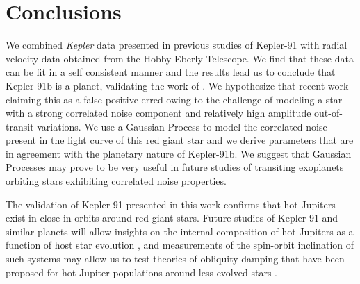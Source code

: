 \documentclass[apjl]{emulateapj}
\begin{document}





\section{Conclusions}
We combined \emph{Kepler} data presented in previous studies of Kepler-91 with radial velocity data obtained from the Hobby-Eberly Telescope. We find that these data can be fit in a self consistent manner and the results lead us to conclude that Kepler-91b is a planet, validating the work of \citet{lillo14}. We hypothesize that recent work claiming this as a false positive erred owing to the challenge of modeling a star with a strong correlated noise component and relatively high amplitude out-of-transit variations. We use a Gaussian Process to model the correlated noise present in the light curve of this red giant star and we derive parameters that are in agreement with the planetary nature of Kepler-91b. We suggest that Gaussian Processes may prove to be very useful in future studies of transiting exoplanets orbiting stars exhibiting correlated noise properties.

The validation of Kepler-91 presented in this work confirms that hot Jupiters exist in close-in orbits around red giant stars. Future studies of Kepler-91 and similar planets will allow insights on the internal composition of hot Jupiters as a function of host star evolution \citep{spiegel12}, and measurements of the spin-orbit inclination of such systems may allow us to test theories of obliquity damping that have been proposed for hot Jupiter populations around less evolved stars \citep{winn10}.
\end{document}
